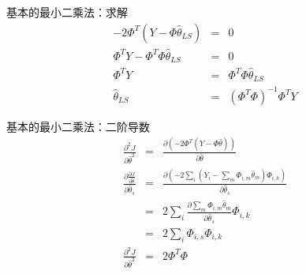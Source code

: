 \begin{frame}{基本的最小二乘法：求解}
\begin{eqnarray*}
-2\Phi^T(Y-\Phi\hat\theta_{LS}) &=&0\\
\Phi^T Y-\Phi^T\Phi\hat\theta_{LS} &=&0\\
\Phi^T Y &=& \Phi^T\Phi\hat\theta_{LS} \\
\hat\theta_{LS}&=& (\Phi^T\Phi)^{-1}\Phi^T Y 
\end{eqnarray*}
\end{frame}

\begin{frame}{基本的最小二乘法：二阶导数}
\begin{eqnarray*}
\frac{\partial^2 J}{\partial\hat\theta^2} &=& \frac{\partial (-2\Phi^T(Y-\Phi\hat\theta))}{\partial\hat\theta} \\
\frac{\partial \frac{\partial J}{\partial\hat\theta}}{\partial \hat\theta_s}&=& \frac{\partial (-2\sum_i(Y_i-\sum_m\Phi_{i,m}\hat\theta_m)\Phi_{i,k})}{\partial \hat\theta_s} \\
&=& 2\sum_i\frac{\partial \sum_m\Phi_{i,m}\hat\theta_m}{\partial \hat\theta_s}\Phi_{i,k} \\
&=& 2\sum_i\Phi_{i,s}\Phi_{i,k} \\
\frac{\partial^2 J}{\partial\hat\theta^2} &=& 2\Phi^T\Phi
\end{eqnarray*}
\end{frame}


